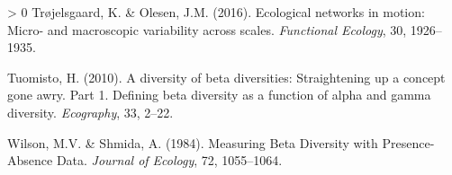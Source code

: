 \documentclass[11pt]{article}
\newlength{\cslhangindent}
\newenvironment{CSLReferences}[3] %
 {%
  \setlength{\parindent}{0pt}
  \ifodd #1 \everypar{\setlength{\hangindent}{\cslhangindent}}\ignorespaces\fi
  \ifnum #2 > 0
  \setlength{\parskip}{#2\baselineskip}
  \fi
 }%
 {}
\begin{document}
\begin{CSLReferences}{1}{0}
\leavevmode\hypertarget{ref-Trojelsgaard2016EcoNet}{}%
Trøjelsgaard, K. \& Olesen, J.M. (2016). Ecological networks in motion:
Micro- and macroscopic variability across scales. \emph{Functional
Ecology}, 30, 1926--1935.

\leavevmode\hypertarget{ref-Tuomisto2010DivBet}{}%
Tuomisto, H. (2010). A diversity of beta diversities: Straightening up a
concept gone awry. Part 1. Defining beta diversity as a function of
alpha and gamma diversity. \emph{Ecography}, 33, 2--22.

\leavevmode\hypertarget{ref-Wilson1984MeaBet}{}%
Wilson, M.V. \& Shmida, A. (1984). Measuring Beta Diversity with
Presence-Absence Data. \emph{Journal of Ecology}, 72, 1055--1064.

\end{CSLReferences}
\end{document}
